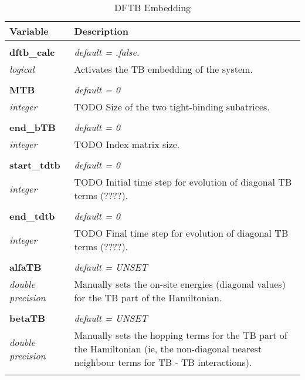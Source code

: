 \begin{Spacing}{1.0}
\begin{longtable}{ p{} p{} }

   \toprule
   \textbf{Variable} & Description \\*
   \midrule \\*
   \endhead

   \bottomrule
   \caption{DFTB Embedding}
   \endfoot

   \textbf{dftb\_calc}
   &  \textit{default = .false. }
   \\*\textit{logical}
   & Activates the TB embedding of the system.\\* \\

   \textbf{MTB}
   &  \textit{default = 0}
   \\*\textit{integer}
   & TODO Size of the two tight-binding subatrices.\\* \\

   \textbf{end\_bTB}
   &  \textit{default = 0}
   \\*\textit{integer}
   & TODO Index matrix size.\\* \\

   \textbf{start\_tdtb}
   &  \textit{default = 0}
   \\*\textit{integer}
   & TODO Initial time step for evolution of diagonal TB 
   terms (????).\\* \\

   \textbf{end\_tdtb}
   &  \textit{default = 0}
   \\*\textit{integer}
   & TODO Final time step for evolution of diagonal TB
   terms (????).\\* \\

   \textbf{alfaTB}
   &  \textit{default = UNSET}
   \\*\textit{double precision}
   & Manually sets the on-site energies (diagonal values)
   for the TB part of the Hamiltonian.\\* \\

   \textbf{betaTB}
   &  \textit{default = UNSET}
   \\*\textit{double precision}
   & Manually sets the hopping terms for the TB part of
   the Hamiltonian (ie, the non-diagonal nearest neighbour
   terms for TB - TB interactions).\\* \\


\end{longtable}
\end{Spacing}
